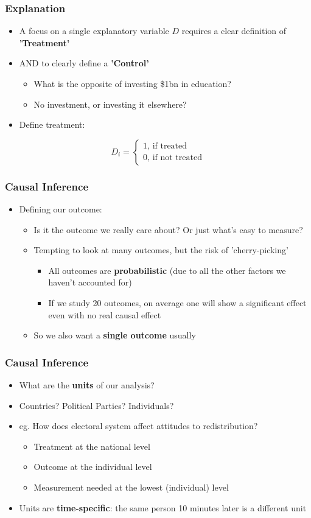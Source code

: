 \documentclass[xcolor=x11names,compress]{beamer}\usepackage[]{graphicx}\usepackage[]{color}
\renewcommand{\(}{\begin{columns}}
\renewcommand{\)}{\end{columns}}
\newcommand{\<}[1]{\begin{column}{#1}}
\renewcommand{\>}{\end{column}}
\begin{document}
\begin{frame}
\frametitle{Explanation}
\begin{itemize}
\item A focus on a single explanatory variable $D$ requires a clear definition of \textbf{'Treatment'}
\item AND to clearly define a \textbf{'Control'}
\begin{itemize}
\item What is the opposite of investing \$1bn in education?
\item No investment, or investing it elsewhere?
\end{itemize}
\item Define treatment:
\end{itemize}
\[D_i = 
\begin{cases}
1 \text{, if treated} \\
0 \text{, if not treated}
\end{cases}
\]
\end{frame}

\begin{frame}
\frametitle{Causal Inference}
\begin{itemize}
\item Defining our outcome:
\begin{itemize}
\item Is it the outcome we really care about? Or just what's easy to measure?
\item Tempting to look at many outcomes, but the risk of 'cherry-picking'
\begin{itemize}
\item All outcomes are \textbf{probabilistic} (due to all the other factors we haven't accounted for)
\item If we study 20 outcomes, on average one will show a significant effect even with no real causal effect
\end{itemize}
\item So we also want a \textbf{single outcome} usually
\end{itemize}
\end{itemize}
\end{frame}

\begin{frame}
\frametitle{Causal Inference}
\begin{itemize}
\item What are the \textbf{units} of our analysis?
\item Countries? Political Parties? Individuals?
\item eg. How does electoral system affect attitudes to redistribution?
\begin{itemize}
\item Treatment at the national level
\item Outcome at the individual level
\item Measurement needed at the lowest (individual) level
\end{itemize}
\item Units are \textbf{time-specific}: the same person 10 minutes later is a different unit
\end{itemize}
\end{frame}
\end{document}

